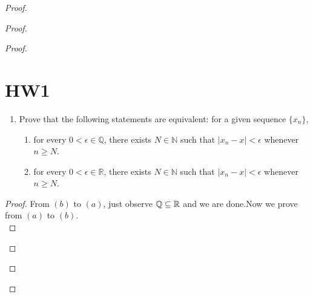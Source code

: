 \documentclass{report}
\begin{document}
\begin{proof}
\begin{proof}
\begin{proof}
\section{HW1}
\begin{question}{}{}
\begin{enumerate}
    \item Prove that the following statements are equivalent: for a given sequence $\{x_n\}$,
    \begin{enumerate}
        \item for every $0 < \epsilon \in \mathbb{Q}$, there exists $N \in \mathbb{N}$ such that $|x_n - x| < \epsilon$ whenever $n \geq N$.
        \item for every $0 < \epsilon \in \mathbb{R}$, there exists $N \in \mathbb{N}$ such that $|x_n - x| < \epsilon$ whenever $n \geq N$.
    \end{enumerate}
\end{enumerate}
\end{question}
\begin{proof}
From $(b)$ to $(a)$, just observe  $\mathbb{Q} \subseteq \mathbb{R}$ and we are done.Now we prove from $(a)$ to $(b)$.\\


\end{proof}
\end{proof}
\end{proof}
\end{proof}
\end{document}

